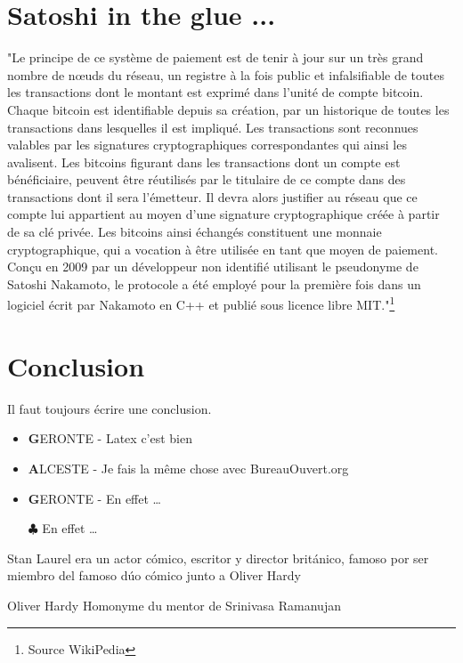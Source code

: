 \documentclass[twocolumn,a4paper]{IEEEtranfr}
\begin{document}
\section{Satoshi in the glue ...}
"Le principe de ce système de paiement est de tenir à jour sur un très grand nombre de nœuds du réseau, un registre à la fois public et infalsifiable de toutes les transactions dont le montant est exprimé dans l'unité de compte bitcoin. Chaque bitcoin est identifiable depuis sa création, par un historique de toutes les transactions dans lesquelles il est impliqué. Les transactions sont reconnues valables par les signatures cryptographiques correspondantes qui ainsi les avalisent. Les bitcoins figurant dans les transactions dont un compte est bénéficiaire, peuvent être réutilisés par le titulaire de ce compte dans des transactions dont il sera l'émetteur. Il devra alors justifier au réseau que ce compte lui appartient au moyen d'une signature cryptographique créée à partir de sa clé privée. Les bitcoins ainsi échangés constituent une monnaie cryptographique, qui a vocation à être utilisée en tant que moyen de paiement.
Conçu en 2009 par un développeur non identifié utilisant le pseudonyme de Satoshi Nakamoto, le protocole a été employé pour la première fois dans un logiciel écrit par Nakamoto en C++ et publié sous licence libre MIT."\footnote{Source WikiPedia}
\section{Conclusion}
Il faut toujours écrire une conclusion. 
\begin{itemize}
  \item {\textbf GERONTE} - Latex c'est bien 
  \item {\textbf ALCESTE} - Je fais la même chose avec BureauOuvert.org
  \item {\textbf GERONTE} - En effet \dots
  \item[$\clubsuit$] En effet \dots
\end{itemize}
% 


{}
\begin{IEEEbiography}
{Stan Laurel } era un actor cómico, escritor y director británico,
famoso por ser miembro del famoso dúo cómico junto a Oliver Hardy 

\end{IEEEbiography}

\begin{IEEEbiography}
{Oliver Hardy} Homonyme du mentor de Srinivasa Ramanujan
\end{IEEEbiography}
\end{document}
